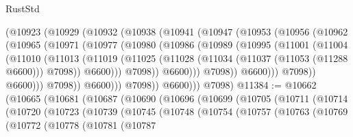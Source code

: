 \begin{lexlean}{RustStd}
\begin{coremodule}
                  (@10923
                    (@10929
                      (@10932
                        (@10938
                          (@10941
                            (@10947
                              (@10953
                                (@10956
                                  (@10962
                                    (@10965
                                      (@10971
                                        (@10977
                                          (@10980
                                            (@10986
                                              (@10989
                                                (@10995
                                                  (@11001
                                                    (@11004
                                                      (@11010
                                                        (@11013
                                                          (@11019
                                                            (@11025
                                                              (@11028
                                                                (@11034
                                                                  (@11037 (@11053 (@11288 @6600)))
                                                                  @7098))
                                                              @6600)))
                                                        @7098))
                                                    @6600)))
                                              @7098))
                                          @6600)))
                                    @7098))
                                @6600)))
                          @7098))
                      @6600)))
                @7098))
            @6600)))
      @7098)
@11384 := @10662
    (@10665
      (@10681
        (@10687
          (@10690
            (@10696
              (@10699
                (@10705
                  (@10711
                    (@10714
                      (@10720
                        (@10723
                          (@10739
                            (@10745
                              (@10748
                                (@10754
                                  (@10757
                                    (@10763
                                      (@10769
                                        (@10772
                                          (@10778
                                            (@10781
                                              (@10787

\end{coremodule}
\end{lexlean}
